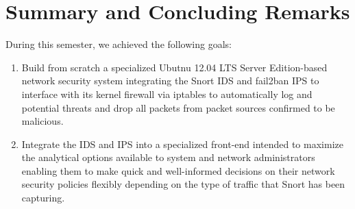 \documentclass[12pt,letterpaper,titlepage]{report}
\begin{document}
{%
%
%
%

\section{Summary and Concluding Remarks}

During this semester, we achieved the following goals:

\begin{enumerate}
\item Build from scratch a specialized Ubutnu 12.04 LTS Server Edition-based
 network security system integrating the Snort IDS and fail2ban IPS to interface
  with its kernel firewall via iptables to automatically log and potential threats
   and drop all packets from packet sources confirmed to be malicious.
   
\item Integrate the IDS and IPS into a specialized front-end intended to maximize 
the analytical options available to system and network administrators enabling them 
to make quick and well-informed decisions on their network security policies flexibly 
depending on the type of traffic that Snort has been capturing. 
\end{enumerate}


}
\end{document}
